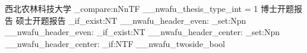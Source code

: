 \ExplSyntaxOn
\NewDocumentCommand{\ProposalRunningHeader}{}
  {
    西北农林科技大学
    \int_compare:nNnTF {\g__nwafu_thesis_type_int} = {1}
      {博士开题报告} {硕士开题报告}
  }
\cs_if_exist:NT \__nwafu_header_even:
  {
    \cs_set:Npn \__nwafu_header_even:
      {\small \nouppercase{\ProposalRunningHeader}}
  }
\cs_if_exist:NT \__nwafu_header_center:
  {
    \cs_set:Npn \__nwafu_header_center:
      {\small \nouppercase{\ProposalRunningHeader}}
  }
\NewDocumentCommand{\ProposalApplyRunningHeader}{}
  {
    \bool_if:NTF \g__nwafu_twoside_bool
      {\nwafuhead[EC]{\small\nouppercase{\ProposalRunningHeader}}}
      {\nwafuhead[C]{\small\nouppercase{\ProposalRunningHeader}}}
  }
\ExplSyntaxOff

